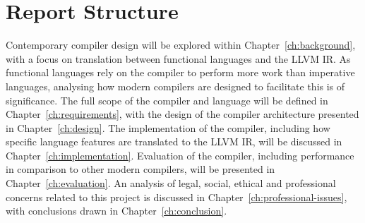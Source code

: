\section{Report Structure}

Contemporary compiler design will be explored within Chapter~\ref{ch:background}, with a focus on
translation between functional languages and the LLVM IR. As functional languages rely on the
compiler to perform more work than imperative languages, analysing how modern compilers are designed
to facilitate this is of significance. The full scope of the compiler and language will be defined
in Chapter~\ref{ch:requirements}, with the design of the compiler architecture presented in
Chapter~\ref{ch:design}. The implementation of the compiler, including how specific language
features are translated to the LLVM IR, will be discussed in Chapter~\ref{ch:implementation}.
Evaluation of the compiler, including performance in comparison to other modern compilers, will be
presented in Chapter~\ref{ch:evaluation}. An analysis of legal, social, ethical and professional
concerns related to this project is discussed in Chapter~\ref{ch:professional-issues}, with
conclusions drawn in Chapter~\ref{ch:conclusion}.
